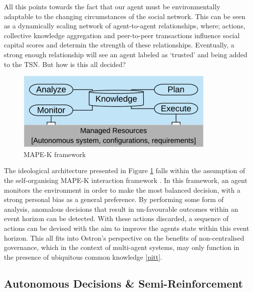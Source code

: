         All this points towards the fact that our agent must be environmentally adaptable to the changing circumstances of the social network. This can be seen as a dynamically scaling network of agent-to-agent relationships, where; actions, collective knowledge aggregation and peer-to-peer transactions influence social capital scores and determin the strength of these relationships. Eventually, a strong enough relationship will see an agent labeled as `trusted' and being added to the TSN. But how is this all decided? 


        \begin{figure}[htb]
            \centering
            \includegraphics{006_team_3_agent_design/FIGS/mapek.jpg}
            \caption{MAPE-K framework}
            \label{fig:mapek_framework}
        \end{figure}

        The ideological architecture presented in Figure \ref{fig:mapek_framework} falls within the assumption of the self-organising MAPE-K interaction framework \cite{mapek}. In this framework, an agent monitors the environment in order to make the most balanced decision, with a strong personal bias as a general preference. By performing some form of analysis, anomalous decisions that result in un-favourable outcomes within an event horizon can be detected. With these actions discarded, a sequence of actions can be devised with the aim to improve the agents state within this event horizon. This all fits into Ostron's perspective on the benefits of non-centralised governance, which in the context of multi-agent systems, may only function in the presence of ubiquitous common knowledge \ref{pitt}. 
        


        
        
    \subsection{Autonomous Decisions \& Semi-Reinforcement}

